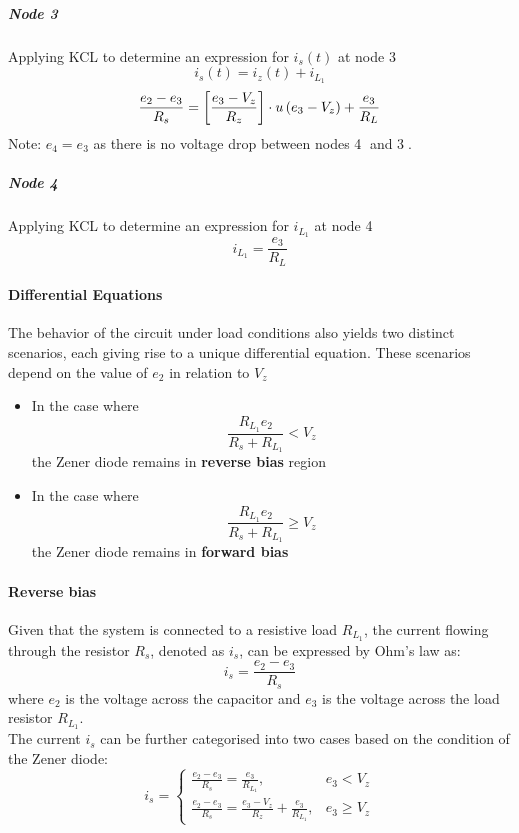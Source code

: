 \subparagraph{Node \textcircled{3}}
Applying KCL to determine an expression for $i_s(t)$ at node \textcircled{3}
\begin{equation}
    i_s(t) = i_z(t) + i_{L_1}
\end{equation}
\begin{equation}
    \frac{e_2-e_3}{R_s}= \left[\frac{e_3 - V_z}{R_z} \right]\cdot u\left(e_3 - V_z \right) +\frac{e_3}{R_L}
\end{equation}
Note: $e_4 = e_3$ as there is no voltage drop between nodes \textcircled{4} and \textcircled{3}.

\subparagraph{Node \textcircled{4}}
Applying KCL to determine an expression for $i_{L_1}$ at node \textcircled{4}
\begin{equation}
	i_{L_1} = \frac{e_3}{R_L}
\end{equation}

\pagebreak
\paragraph{Differential Equations}
The behavior of the circuit under load conditions also yields two distinct scenarios, each giving rise to a unique differential equation. These scenarios depend on the value of \(e_2\) in relation to \(V_z\)

\begin{itemize}
	\item In the case where $$\frac{R_{L_1}e_2}{R_s+R_{L_1}} < V_z$$ the Zener diode remains in \textbf{reverse bias} region
	\item In the case where $$\frac{R_{L_1}e_2}{R_s+R_{L_1}} \geq V_z$$ the Zener diode remains in \textbf{forward bias}
\end{itemize}

\paragraph{Reverse bias}
Given that the system is connected to a resistive load $R_{L_1}$, the current flowing through the resistor $R_s$, denoted as $i_s$, can be expressed by Ohm's law as:
\begin{equation}
    i_s = \frac{e_2 - e_3}{R_s}
\end{equation}
where $e_2$ is the voltage across the capacitor and $e_3$ is the voltage across the load resistor $R_{L_1}$.
\\
The current $i_s$ can be further categorised into two cases based on the condition of the Zener diode:
\begin{equation}
    i_s=\begin{cases}
        \frac{e_2-e_3}{R_s}=\frac{e_3}{R_{L_1}},  & e_3<V_z\\
        \frac{e_2-e_3}{R_s}=\frac{e_3-V_z}{R_z}+\frac{e_3}{R_{L_1}},  & e_3 \geq V_z
    \end{cases}
    \label{eq:is_cases}
\end{equation}


